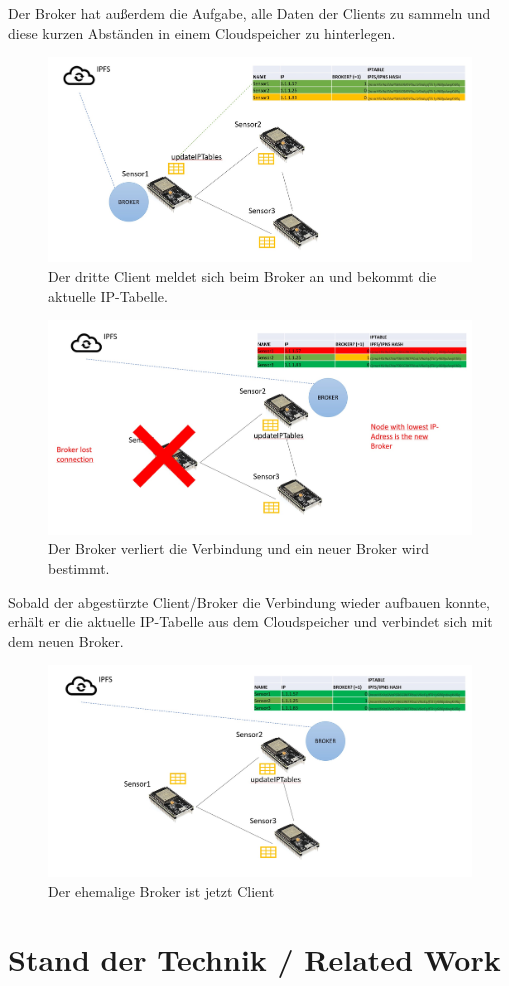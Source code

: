 \documentclass{article}
\begin{document}
Der Broker hat außerdem die Aufgabe, alle Daten der Clients zu sammeln und diese kurzen Abständen in einem Cloudspeicher zu hinterlegen. 
\begin{figure}[h]
    \centering
    \includegraphics[width=1\linewidth]{Porposal/Bilder/Bild3.jpg}
    \caption{Der dritte Client meldet sich beim Broker an und bekommt die aktuelle IP-Tabelle.}
    \label{fig:statemachine}
\end{figure}
\begin{figure}[h]
    \centering
    \includegraphics[width=1\linewidth]{Porposal/Bilder/Bild4.jpg}
    \caption{Der Broker verliert die Verbindung und ein neuer Broker wird bestimmt. }
    \label{fig:statemachine}
\end{figure}

Sobald der abgestürzte Client/Broker die Verbindung wieder aufbauen konnte, erhält er die aktuelle IP-Tabelle aus dem Cloudspeicher und verbindet sich mit dem neuen Broker.

\begin{figure}[h]
    \centering
    \includegraphics[width=1\linewidth]{Porposal/Bilder/Bild5.jpg}
    \caption{Der ehemalige Broker ist jetzt Client}
    \label{fig:statemachine}
\end{figure}

\section{Stand der Technik / Related Work}
\end{document}
